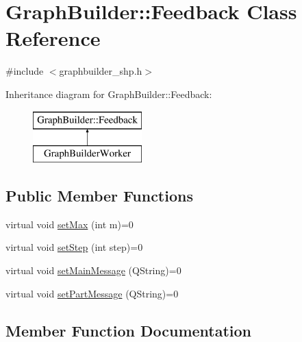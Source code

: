 \hypertarget{class_graph_builder_1_1_feedback}{}\section{Graph\+Builder\+::Feedback Class Reference}
\label{class_graph_builder_1_1_feedback}


{\ttfamily \#include $<$graphbuilder\+\_\+shp.\+h$>$}

Inheritance diagram for Graph\+Builder\+::Feedback\+:\begin{figure}[H]
\begin{center}
\leavevmode
\includegraphics[height=2.000000cm]{da/d3c/class_graph_builder_1_1_feedback}
\end{center}
\end{figure}
\subsection*{Public Member Functions}
\begin{DoxyCompactItemize}
\item 
virtual void \mbox{\hyperlink{class_graph_builder_1_1_feedback_a9b06431c665384b1fb626d3874c3067f}{set\+Max}} (int m)=0
\item 
virtual void \mbox{\hyperlink{class_graph_builder_1_1_feedback_a66a5931e6ddd5b54165125b39253f2ae}{set\+Step}} (int step)=0
\item 
virtual void \mbox{\hyperlink{class_graph_builder_1_1_feedback_afd4fb900bf3b520e561016614ce5609c}{set\+Main\+Message}} (Q\+String)=0
\item 
virtual void \mbox{\hyperlink{class_graph_builder_1_1_feedback_a0a2b4ab63a8a85a79eb4f00695bde851}{set\+Part\+Message}} (Q\+String)=0
\end{DoxyCompactItemize}


\subsection{Member Function Documentation}
\mbox{\label{class_graph_builder_1_1_feedback_afd4fb900bf3b520e561016614ce5609c}} 
